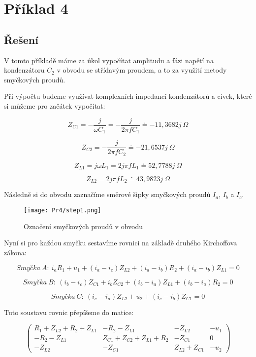 \section{Příklad 4}

\subsection{Řešení}

V tomto příkladě máme za úkol vypočítat amplitudu a fázi napětí na kondenzátoru $C_2$ v obvodu se 
střídavým proudem, a to za využití metody smyčkových proudů. 

Při výpočtu budeme využívat komplexních impedancí kondenzátorů a cívek, které si můžeme pro začátek vypočítat:

$$ Z_{C1} = -\frac{j}{\omega C_1} = -\frac{j}{2 \pi f C_1} \doteq -11,3682j \: \Omega $$

$$ Z_{C2} = -\frac{j}{2 \pi f C_2} \doteq -21,6537j \: \Omega $$

$$ Z_{L1} = j \omega L_1 = 2 j \pi f L_1 \doteq 52,7788j \: \Omega $$

$$ Z_{L2} = 2 j \pi f L_2 \doteq 43,9823j \: \Omega $$

Následně si do obvodu zaznačíme směrové šipky smyčkových proudů $I_a$, $I_b$ a $I_c$. 

\begin{figure}[H]
\texttt{[image: Pr4/step1.png]}
\centering
\caption{Označení smyčkových proudů v obvodu}
\end{figure}

Nyní si pro každou smyčku sestavíme rovnici na základě druhého Kirchoffova zákona: 

$$ Smyčka \: A: \: i_aR_1 + u_1 + (i_a - i_c)Z_{L2} + (i_a - i_b)R_2 + (i_a - i_b)Z_{L1} = 0 $$

$$ Smyčka \: B: \: (i_b - i_c)Z_{C1} + i_bZ_{C2} + (i_b - i_a)Z_{L1} + (i_b - i_a)R_2 = 0 $$

$$ Smyčka \: C: \: (i_c - i_a)Z_{L2} + u_2 + (i_c - i_b)Z_{C1} = 0 $$

Tuto soustavu rovnic přepíšeme do matice:

$$ \left (
\begin{array}{ccc|c}
	R_1 + Z_{L2} + R_2 + Z_{L1} & -R_2 - Z_{L1} & -Z_{L2} & - u_1 \\
	-R_2 - Z_{L1} & Z_{C1} + Z_{C2} + Z_{L1} + R_2 & -Z_{C1} & 0 \\
	-Z_{L2} & -Z_{C1} & Z_{L2} + Z_{C1} & - u_2
\end{array}
\right) $$

